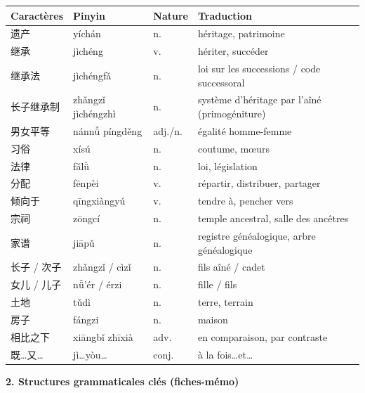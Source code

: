 \documentclass[11pt]{article}
\begin{document}
\begin{center}
\begin{tabularx}{\linewidth}{|X|X|X|X|}\hline
\rowcolor{popblueL} \textbf{Caractères} & \textbf{Pinyin} & \textbf{Nature} & \textbf{Traduction} \\ \hline
遗产 & yíchán & n. & héritage, patrimoine \\ \hline
继承 & jìchéng & v. & hériter, succéder \\ \hline
继承法 & jìchéngfǎ & n. & loi sur les successions / code successoral \\ \hline
长子继承制 & zhǎngzǐ jìchéngzhì & n. & système d'héritage par l'aîné (primogéniture) \\ \hline
男女平等 & nánnǚ píngděng & adj./n. & égalité homme-femme \\ \hline
习俗 & xísú & n. & coutume, mœurs \\ \hline
法律 & fǎlǜ & n. & loi, législation \\ \hline
分配 & fēnpèi & v. & répartir, distribuer, partager \\ \hline
倾向于 & qīngxiàngyú & v. & tendre à, pencher vers \\ \hline
宗祠 & zōngcí & n. & temple ancestral, salle des ancêtres \\ \hline
家谱 & jiāpǔ & n. & registre généalogique, arbre généalogique \\ \hline
长子 / 次子 & zhǎngzǐ / cìzǐ & n. & fils aîné / cadet \\ \hline
女儿 / 儿子 & nǚ'ér / érzi & n. & fille / fils \\ \hline
土地 & tǔdì & n. & terre, terrain \\ \hline
房子 & fángzi & n. & maison \\ \hline
相比之下 & xiāngbǐ zhīxià & adv. & en comparaison, par contraste \\ \hline
既\ldots{}又\ldots{} & jì\ldots{}yòu\ldots{} & conj. & à la fois\ldots{}et\ldots{} \\ \hline
\end{tabularx}
\end{center}

\noindent \textbf{2. Structures grammaticales clés (fiches-mémo)}
\end{document}
